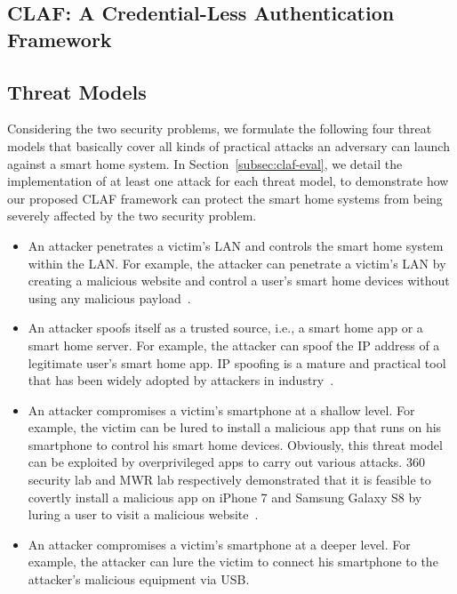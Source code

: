 \documentclass[letterpaper,12pt]{article}
\begin{document}
   \newpage
   \begin{singlespace}
   \section{CLAF: A Credential-Less Authentication Framework}
   \end{singlespace}
   \label{sec:claf}
   
\subsection{Threat Models}
Considering the two security problems, we formulate the following four threat models that basically cover all kinds of practical attacks an adversary can launch against a smart home system. In Section~\ref{subsec:claf-eval}, we detail the implementation of at least one attack for each threat model, to demonstrate how our proposed CLAF framework can protect the smart home systems from being severely affected by the two security problem. 

\begin{itemize}
\item An attacker penetrates a victim's LAN and controls the smart home system within the LAN. 
For example, the attacker can penetrate a victim's LAN by creating a malicious website and control a user's smart home devices without using any malicious payload~\cite{jia2018traffic}. 

\item An attacker spoofs itself as a trusted source, i.e., a smart home app or a smart home server. For example, the attacker can spoof the IP address of a legitimate user's smart home app.  
IP spoofing is a mature and practical tool that has been widely adopted by attackers in industry~\cite{tanase2003ip}. 

\item An attacker compromises a victim's smartphone at a shallow level. For example, the victim can be lured to install a malicious app that runs on his smartphone to control his smart home devices. Obviously, this threat model can be exploited by overprivileged apps to carry out various attacks. 
360 security lab and MWR lab respectively demonstrated that it is feasible to covertly install a malicious app on iPhone 7 and Samsung Galaxy S8 by luring a user to visit a malicious website~\cite{pwn2own2017}. 

\item An attacker compromises a victim's smartphone at a deeper level. For example, the attacker can lure the victim to connect his smartphone to the attacker's malicious equipment via USB. %

\end{itemize}
\end{document}
